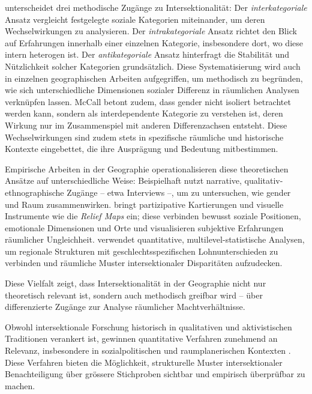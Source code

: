 \textcite{mccallComplexityIntersectionality2005} unterscheidet drei methodische Zugänge zu Intersektionalität: Der \emph{interkategoriale} Ansatz vergleicht festgelegte soziale Kategorien miteinander, um deren Wechselwirkungen zu analysieren. Der \emph{intrakategoriale} Ansatz richtet den Blick auf Erfahrungen innerhalb einer einzelnen Kategorie, insbesondere dort, wo diese intern heterogen ist. Der \emph{antikategoriale} Ansatz hinterfragt die Stabilität und Nützlichkeit solcher Kategorien grundsätzlich. Diese Systematisierung wird auch in einzelnen geographischen Arbeiten aufgegriffen, um methodisch zu begründen, wie sich unterschiedliche Dimensionen sozialer Differenz in räumlichen Analysen verknüpfen lassen. McCall betont zudem, dass \gls{gender} nicht isoliert betrachtet werden kann, sondern als interdependente Kategorie zu verstehen ist, deren Wirkung nur im Zusammenspiel mit anderen Differenzachsen entsteht. Diese Wechselwirkungen sind zudem stets in spezifische räumliche und historische Kontexte eingebettet, die ihre Ausprägung und Bedeutung mitbestimmen.

Empirische Arbeiten in der Geographie operationalisieren diese theoretischen Ansätze auf unterschiedliche Weise: Beispielhaft nutzt \textcite{fensterRightGenderedCity2005} narrative, qualitativ-ethnographische Zugänge -- etwa Interviews --, um zu untersuchen, wie \gls{gender} und Raum zusammenwirken. \textcite{rodo-de-zarateDevelopingGeographiesIntersectionality2014} bringt partizipative Kartierungen und visuelle Instrumente wie die \emph{Relief Maps} ein; diese verbinden bewusst soziale Positionen, emotionale Dimensionen und Orte und visualisieren subjektive Erfahrungen räumlicher Ungleichheit. \textcite{mccallSpatialRoutesGender1998} verwendet quantitative, multilevel-statistische Analysen, um regionale Strukturen mit geschlechtsspezifischen Lohnunterschieden zu verbinden und räumliche Muster intersektionaler Disparitäten aufzudecken. 

Diese Vielfalt zeigt, dass Intersektionalität in der Geographie nicht nur theoretisch relevant ist, sondern auch methodisch greifbar wird -- über differenzierte Zugänge zur Analyse räumlicher Machtverhältnisse.


\vspace{2em}

Obwohl intersektionale Forschung historisch in qualitativen und aktivistischen Traditionen verankert ist, gewinnen quantitative Verfahren zunehmend an Relevanz, insbesondere in sozialpolitischen und raumplanerischen Kontexten \parencite{bauerIntersectionalityQuantitativeResearch2021}. Diese Verfahren bieten die Möglichkeit, strukturelle Muster intersektionaler Benachteiligung über grössere Stichproben sichtbar und empirisch überprüfbar zu machen.

